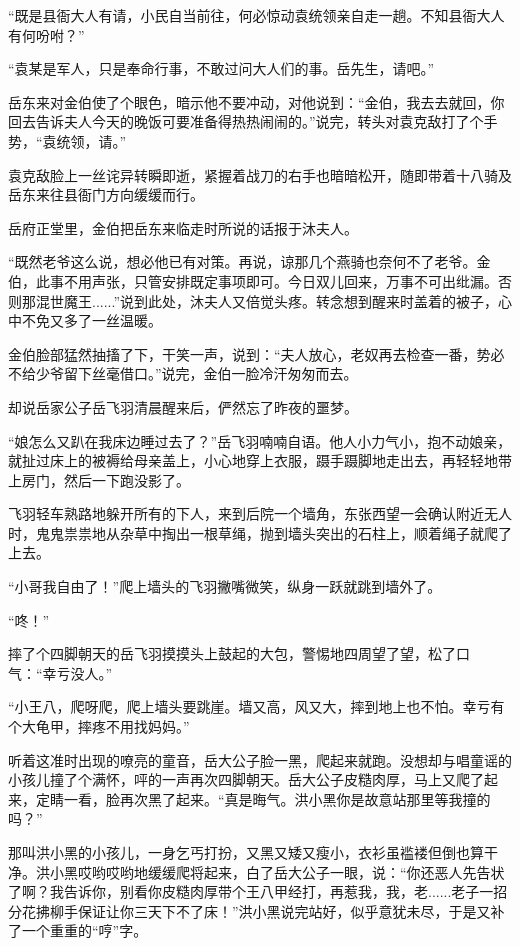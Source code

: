 “既是县衙大人有请，小民自当前往，何必惊动袁统领亲自走一趟。不知县衙大人有何吩咐？”

“袁某是军人，只是奉命行事，不敢过问大人们的事。岳先生，请吧。”

岳东来对金伯使了个眼色，暗示他不要冲动，对他说到：“金伯，我去去就回，你回去告诉夫人今天的晚饭可要准备得热热闹闹的。”说完，转头对袁克敌打了个手势，“袁统领，请。”

袁克敌脸上一丝诧异转瞬即逝，紧握着战刀的右手也暗暗松开，随即带着十八骑及岳东来往县衙门方向缓缓而行。

\splitline

岳府正堂里，金伯把岳东来临走时所说的话报于沐夫人。

“既然老爷这么说，想必他已有对策。再说，谅那几个燕骑也奈何不了老爷。金伯，此事不用声张，只管安排既定事项即可。今日双儿回来，万事不可出纰漏。否则那混世魔王......”说到此处，沐夫人又倍觉头疼。转念想到醒来时盖着的被子，心中不免又多了一丝温暖。

金伯脸部猛然抽搐了下，干笑一声，说到：“夫人放心，老奴再去检查一番，势必不给少爷留下丝毫借口。”说完，金伯一脸冷汗匆匆而去。

\splitline

却说岳家公子岳飞羽清晨醒来后，俨然忘了昨夜的噩梦。

“娘怎么又趴在我床边睡过去了？”岳飞羽喃喃自语。他人小力气小，抱不动娘亲，就扯过床上的被褥给母亲盖上，小心地穿上衣服，蹑手蹑脚地走出去，再轻轻地带上房门，然后一下跑没影了。

飞羽轻车熟路地躲开所有的下人，来到后院一个墙角，东张西望一会确认附近无人时，鬼鬼祟祟地从杂草中掏出一根草绳，抛到墙头突出的石柱上，顺着绳子就爬了上去。

“小哥我自由了！”爬上墙头的飞羽撇嘴微笑，纵身一跃就跳到墙外了。

“咚！”

摔了个四脚朝天的岳飞羽摸摸头上鼓起的大包，警惕地四周望了望，松了口气：“幸亏没人。”

“小王八，爬呀爬，爬上墙头要跳崖。墙又高，风又大，摔到地上也不怕。幸亏有个大龟甲，摔疼不用找妈妈。”

听着这准时出现的嘹亮的童音，岳大公子脸一黑，爬起来就跑。没想却与唱童谣的小孩儿撞了个满怀，呯的一声再次四脚朝天。岳大公子皮糙肉厚，马上又爬了起来，定睛一看，脸再次黑了起来。“真是晦气。洪小黑你是故意站那里等我撞的吗？”

那叫洪小黑的小孩儿，一身乞丐打扮，又黑又矮又瘦小，衣衫虽褴褛但倒也算干净。洪小黑哎哟哎哟地缓缓爬将起来，白了岳大公子一眼，说：“你还恶人先告状了啊？我告诉你，别看你皮糙肉厚带个王八甲经打，再惹我，我，老......老子一招分花拂柳手保证让你三天下不了床！”洪小黑说完站好，似乎意犹未尽，于是又补了一个重重的“哼”字。

